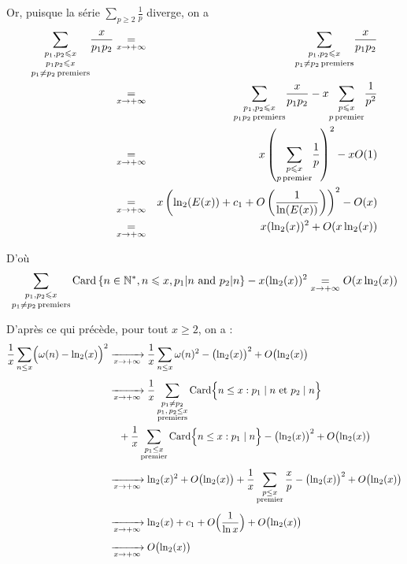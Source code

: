 Or, puisque la s{\'e}rie $\underset{p \geqslant 2}{\sum} \frac{1}{p}$ diverge,
on a
\begin{eqnarray*}
  \underset{p_1 \not{=} p_2 \operatorname{premiers}}{\underset{p_1 p_2 \leqslant
  x}{\underset{p_1, p_2 \leqslant x}{\sum}}} \frac{x}{p_1 p_2} & \underset{x
  \rightarrow + \infty}{=} & \underset{p_1 \not{=} p_2
  \operatorname{premiers}}{\underset{p_1, p_2 \leqslant x}{\sum}} \frac{x}{p_1 p_2}\\
  & \underset{x \rightarrow + \infty}{=} & \underset{p_1 p_2
  \operatorname{premiers}}{\underset{p_1, p_2 \leqslant x}{\sum}} \frac{x}{p_1 p_2} -
  x \underset{p  \operatorname{premier}}{\underset{p  \leqslant x}{\sum}}
  \frac{1}{p^2}\\
  & \underset{x \rightarrow + \infty}{=} & x \left( \underset{p 
  \operatorname{premier}}{\underset{p  \leqslant x}{\sum}} \frac{1}{p} \right)^2 - x O
  (1)\\
  & \underset{x \rightarrow + \infty}{=} & x \left( \ln_2 (E (x)) + c_1 + O
  \left( \frac{1}{\ln (E (x))} \right) \right)^2 - O (x)\\
  & \underset{x \rightarrow + \infty}{=} & x (\ln_2 (x))^2 + O (x \ln_2 (x))
\end{eqnarray*}


D'o{\`u}
\[ \underset{p_1 \not{=} p_2 \operatorname{premiers}}{\underset{p_1, p_2 \leqslant
   x}{\sum}} \operatorname{Card} \left\{ n \in \mathbb{N}^{\ast}, n \leqslant x, p_1 
   | n  \text{ and } p_2 | n  \right\} - x (\ln_2 (x))^2
   \underset{x \rightarrow + \infty}{=} O (x \ln_2 (x)) \]


 {\color[HTML]{000000}D'apr{\`e}s ce }qui pr{\'e}c{\`e}de,
pour tout $x \geqslant 2$, on a :
\begin{align*}
\frac{1}{x} \sum_{n \leq x} \Bigl( \omega(n) - \ln_2(x) \Bigr)^2 
&\xrightarrow[x \to +\infty]{} 
\frac{1}{x} \sum_{n \leq x} \omega(n)^2 - \bigl(\ln_2(x)\bigr)^2 + O\bigl(\ln_2(x)\bigr) \\[1ex]
&\xrightarrow[x \to +\infty]{} 
\frac{1}{x} \sum_{\substack{p_1 \ne p_2 \\ p_1,\, p_2 \leq x \\ \text{premiers}}}
\operatorname{Card}\Bigl\{ n \leq x : p_1 \mid n \text{ et } p_2 \mid n \Bigr\} \\
&\quad + \frac{1}{x} \sum_{\substack{p_1 \leq x \\ \text{premier}}}
\operatorname{Card}\Bigl\{ n \leq x : p_1 \mid n \Bigr\}
- \bigl(\ln_2(x)\bigr)^2 + O\bigl(\ln_2(x)\bigr) \\[1ex]
&\xrightarrow[x \to +\infty]{} 
\ln_2(x)^2 + O\bigl(\ln_2(x)\bigr) + \frac{1}{x} \sum_{\substack{p \leq x \\ \text{premier}}}
\frac{x}{p} - \bigl(\ln_2(x)\bigr)^2 + O\bigl(\ln_2(x)\bigr) \\[1ex]
&\xrightarrow[x \to +\infty]{} 
\ln_2(x) + c_1 + O\Bigl(\frac{1}{\ln x}\Bigr) + O\bigl(\ln_2(x)\bigr) \\[1ex]
&\xrightarrow[x \to +\infty]{} 
O\bigl(\ln_2(x)\bigr)
\end{align*}


